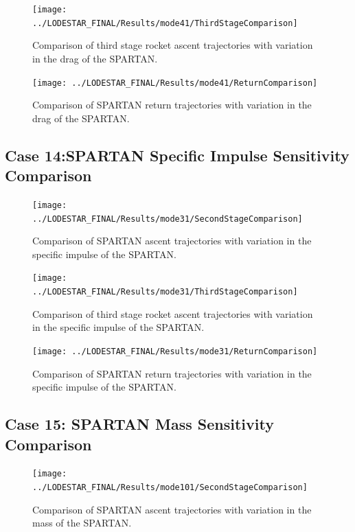\begin{figure}[!th]
\centering
\texttt{[image: ../LODESTAR\_FINAL/Results/mode41/ThirdStageComparison]}
\caption{Comparison of third stage rocket ascent trajectories with variation in the drag of the SPARTAN.}
\label{fig:ThirdStageComparison11}
\end{figure}

\begin{figure}[!th]
\centering
\texttt{[image: ../LODESTAR\_FINAL/Results/mode41/ReturnComparison]}
\caption{Comparison of SPARTAN return trajectories with variation in the drag of the SPARTAN.}
\label{fig:ReturnComparison11}
\end{figure}

\FloatBarrier
\clearpage
\subsection{Case 14:SPARTAN Specific Impulse Sensitivity Comparison}\label{sec:app_comparison31}
\begin{figure}[!th]
	\centering
	\texttt{[image: ../LODESTAR\_FINAL/Results/mode31/SecondStageComparison]}
	\caption{Comparison of SPARTAN ascent trajectories with variation in the specific impulse of the SPARTAN.}
	\label{fig:SecondStageComparison10}
\end{figure}

\begin{figure}[!th]
	\centering
	\texttt{[image: ../LODESTAR\_FINAL/Results/mode31/ThirdStageComparison]}
	\caption{Comparison of third stage rocket ascent trajectories with variation in the specific impulse of the SPARTAN.}
	\label{fig:ThirdStageComparison10}
\end{figure}

\begin{figure}[!th]
	\centering
	\texttt{[image: ../LODESTAR\_FINAL/Results/mode31/ReturnComparison]}
	\caption{Comparison of SPARTAN return trajectories with variation in the specific impulse of the SPARTAN.}
	\label{fig:ReturnComparison10}
\end{figure}
\FloatBarrier
\clearpage
\subsection{Case 15: SPARTAN Mass Sensitivity Comparison}\label{sec:app_comparison101}

\begin{figure}[!th]
\centering
\texttt{[image: ../LODESTAR\_FINAL/Results/mode101/SecondStageComparison]}
\caption{Comparison of SPARTAN ascent trajectories with variation in the mass of the SPARTAN.}
\label{fig:SecondStageComparison12}
\end{figure}

